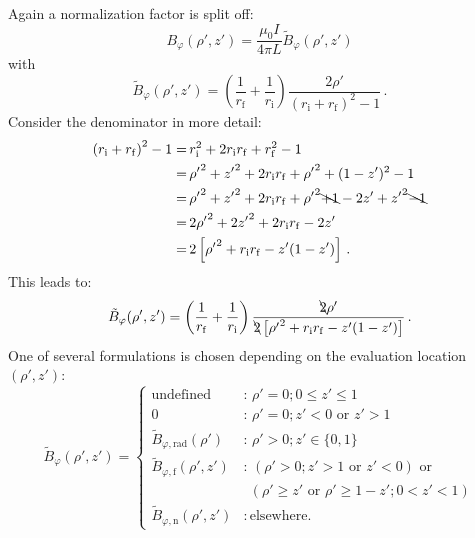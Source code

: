 Again a normalization factor is split off:
\begin{equation}
  B_\varphi(\rho', z') = \frac{\mu_0 I}{4 \pi L} \tilde{B}_\varphi(\rho', z')
\end{equation}
with
\begin{equation}
  \tilde{B}_\varphi(\rho', z')
  = \left(\frac{1}{r_\mathrm{f}} + \frac{1}{r_\mathrm{i}} \right)
    \frac{2 \rho'}{\left( r_\mathrm{i} + r_\mathrm{f} \right)^2 - 1} \, .
\end{equation}
Consider the denominator in more detail:
\begin{align}
 \left(r_\mathrm{i} + r_\mathrm{f}\right)^2 - 1
 =&\, r_\mathrm{i}^2 + 2 r_\mathrm{i} r_\mathrm{f} + r_\mathrm{f}^2 - 1 \nonumber \\
 =&\, {\rho'}^2 + {z'}^2 + 2 r_\mathrm{i} r_\mathrm{f} + {\rho'}^2 + (1 - z')^2 - 1 \nonumber \\
 =&\, {\rho'}^2 + {z'}^2 + 2 r_\mathrm{i} r_\mathrm{f} + {\rho'}^2 \bcancel{+ 1} - 2 z' + {z'}^2 \bcancel{- 1} \nonumber \\
 =&\, 2 {\rho'}^2 + 2 {z'}^2 + 2 r_\mathrm{i} r_\mathrm{f} - 2 z' \nonumber \\
 =&\, 2 \left[ {\rho'}^2 + r_\mathrm{i} r_\mathrm{f} - z' (1 - z') \right] \, .
\end{align}
This leads to:
\begin{equation}
 \tilde{B}_\varphi(\rho', z')
  = \left(\frac{1}{r_\mathrm{f}} + \frac{1}{r_\mathrm{i}} \right)
    \frac{\bcancel{2} \rho'}{\bcancel{2} \left[ {\rho'}^2 + r_\mathrm{i} r_\mathrm{f} - z' (1 - z') \right]} \, . \label{eqn:bPhiTilde}
\end{equation}
One of several formulations is chosen depending on the evaluation location~$(\rho', z')$:
\begin{equation}
  \tilde{B}_\varphi (\rho', z') =
  \begin{cases}
    \textrm{undefined}                           &:\, \rho' = 0; 0 \leq z' \leq 1 \\
    0                                            &:\, \rho' = 0; z' < 0 \textrm{ or } z' > 1 \\
    \tilde{B}_{\varphi,\mathrm{rad}} (\rho')     &:\, \rho' > 0; z' \in \{0, 1\} \\
    \tilde{B}_{\varphi,\mathrm{f}}   (\rho', z') &:\, (\rho' > 0; z' > 1 \textrm{ or } z' < 0) \textrm{ or } \\
                                            ~    &~~  (\rho' \geq z' \textrm{ or } \rho' \geq 1-z'; 0 < z' < 1) \\
    \tilde{B}_{\varphi,\mathrm{n}}   (\rho', z') &:\, \textrm{elsewhere.}
  \end{cases} \label{eqn:sws_B_phi_switchover}
\end{equation}
